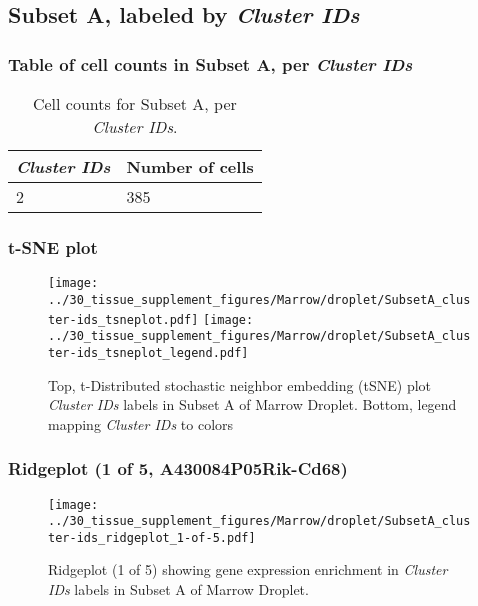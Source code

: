 \clearpage

\subsection{Subset A, labeled by \emph{Cluster IDs}}
\subsubsection{Table of cell counts in Subset A, per \emph{Cluster IDs}}\begin{table}[h]
\centering
\label{my-label}
\begin{tabular}{@{}ll@{}}
\toprule

\emph{Cluster IDs}& Number of cells \\ \midrule
2 & 385 \\
\bottomrule
\end{tabular}
\caption{Cell counts for Subset A, per \emph{Cluster IDs}.}
\end{table}

\clearpage
\subsubsection{t-SNE plot}
\begin{figure}[h]
\centering
\texttt{[image: ../30\_tissue\_supplement\_figures/Marrow/droplet/SubsetA\_cluster-ids\_tsneplot.pdf]}
\texttt{[image: ../30\_tissue\_supplement\_figures/Marrow/droplet/SubsetA\_cluster-ids\_tsneplot\_legend.pdf]}
\caption{Top, t-Distributed stochastic neighbor embedding (tSNE) plot  \emph{Cluster IDs} labels in Subset A of Marrow Droplet. Bottom, legend mapping \emph{Cluster IDs} to colors}
\end{figure}


\clearpage

\subsubsection{Ridgeplot (1 of 5, A430084P05Rik-Cd68)}
\begin{figure}[h]
\centering
\texttt{[image: ../30\_tissue\_supplement\_figures/Marrow/droplet/SubsetA\_cluster-ids\_ridgeplot\_1-of-5.pdf]}

\caption{ Ridgeplot (1 of 5)  showing gene expression enrichment in \emph{Cluster IDs} labels in Subset A of Marrow Droplet. }
\end{figure}


\clearpage

